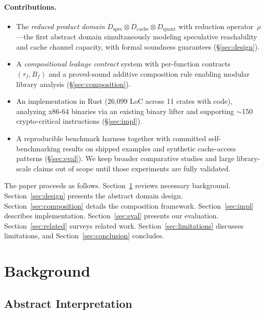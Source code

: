 \documentclass{article}
\theoremstyle{definition}
\theoremstyle{remark}
\newcommand{\Dspec}{D_{\text{spec}}}
\newcommand{\Dcache}{D_{\text{cache}}}
\newcommand{\Dquant}{D_{\text{quant}}}
\newcommand{\Bf}{B_f}
\newcommand{\tauf}{\tau_f}
\begin{document}
\paragraph{Contributions.}
\begin{itemize}[nosep]
\item The \emph{reduced product domain}
  $\Dspec \otimes \Dcache \otimes \Dquant$ with reduction
  operator~$\rho$---the first abstract domain simultaneously modeling
  speculative reachability and cache channel capacity, with formal
  soundness guarantees (\S\ref{sec:design}).
\item A \emph{compositional leakage contract} system with per-function
  contracts $(\tauf, \Bf)$ and a proved-sound additive composition rule
  enabling modular library analysis (\S\ref{sec:composition}).
\item An implementation in Rust (26,099 LoC across 11 crates with code),
  analyzing x86-64 binaries via an existing binary lifter and
  supporting $\sim$150 crypto-critical instructions (\S\ref{sec:impl}).
\item A reproducible benchmark harness together with committed
  self-benchmarking results on shipped examples and synthetic
  cache-access patterns (\S\ref{sec:eval}).  We keep broader comparative
  studies and large library-scale claims out of scope until those
  experiments are fully validated.
\end{itemize}

\noindent
The paper proceeds as follows.  Section~\ref{sec:background} reviews
necessary background.  Section~\ref{sec:design} presents the abstract
domain design.  Section~\ref{sec:composition} details the composition
framework.  Section~\ref{sec:impl} describes implementation.
Section~\ref{sec:eval} presents our evaluation.
Section~\ref{sec:related} surveys related work.
Section~\ref{sec:limitations} discusses limitations, and
Section~\ref{sec:conclusion} concludes.

\section{Background}
\label{sec:background}

\subsection{Abstract Interpretation}
\label{sec:bg-ai}
\end{document}
